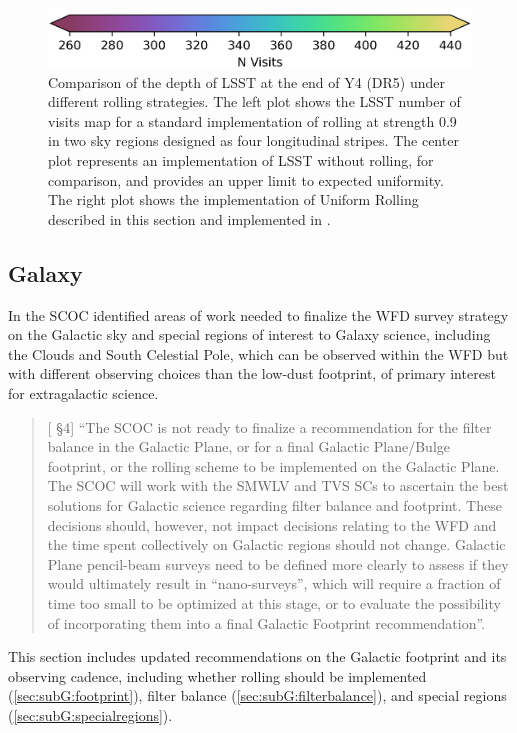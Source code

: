 \begin{figure}
    \includegraphics[width=0.6\linewidth]{figures/roll_colorbar.png}
    \caption{Comparison of the depth of LSST at the end of Y4 (DR5) under different rolling strategies. The left plot shows the LSST number of visits map for a standard implementation of rolling at strength 0.9 in two sky regions designed as four longitudinal stripes. The center plot represents an implementation of LSST without rolling, for comparison, and provides an upper limit to expected uniformity. The right plot shows the implementation of Uniform Rolling described in this section and implemented in .}
    \label{fig:uniform-rolling}
\end{figure}

\FloatBarrier


\subsection{Galaxy}\label{sec:galaxy}
In  the SCOC identified areas of work needed to finalize the WFD survey strategy on the Galactic sky and special regions of interest to Galaxy science, including the Clouds and South Celestial Pole, which can be observed within the WFD but with different observing choices than the low-dust footprint, of primary interest for extragalactic science. 

\begin{quote}
    {[ \S4] ``The SCOC is not ready to finalize a recommendation for the filter balance in the Galactic Plane, or for a final Galactic Plane/Bulge footprint, or the rolling scheme to be implemented on the Galactic Plane. The SCOC will work with the SMWLV and TVS SCs to ascertain the best solutions for Galactic science regarding filter balance and footprint. These decisions should, however, not impact decisions relating to the WFD and the time spent collectively on Galactic regions should not change. Galactic Plane pencil-beam surveys need to be defined more clearly to assess if they would ultimately result in ``nano-surveys'', which will require a fraction of time too small to be optimized at this stage, or to evaluate the possibility of incorporating them into a final Galactic Footprint recommendation''.}
\end{quote}

This section includes updated recommendations on the Galactic footprint and its observing cadence, including whether rolling should be implemented (\autoref{sec:subG:footprint}), filter balance (\autoref{sec:subG:filterbalance}), and special regions (\autoref{sec:subG:specialregions}).

